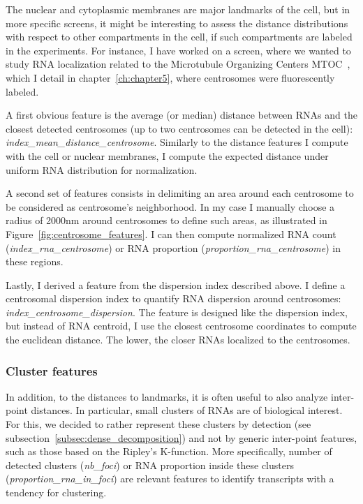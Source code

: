 The nuclear and cytoplasmic membranes are major landmarks of the cell, but in more specific screens, it might be interesting to assess the distance distributions with respect to other compartments in the cell, if such compartments are labeled in the experiments.
For instance, I have worked on a screen, where we wanted to study \ac{RNA} localization related to the Microtubule Organizing Centers \ac{MTOC}~\cite{safieddine_choreography_2021}, which I detail in chapter~\ref{ch:chapter5}, where centrosomes were fluorescently labeled.

A first obvious feature is the average (or median) distance between \ac{RNA}s and the closest detected centrosomes (up to two centrosomes can be detected in the cell): \emph{index\_mean\_distance\_centrosome}.
Similarly to the distance features I compute with the cell or nuclear membranes, I compute the expected distance under uniform \ac{RNA} distribution for normalization.

A second set of features consists in delimiting an area around each centrosome to be considered as centrosome's neighborhood.
In my case I manually choose a radius of 2000nm around centrosomes to define such areas, as illustrated in Figure~\ref{fig:centrosome_features}.
I can then compute normalized \ac{RNA} count (\emph{index\_rna\_centrosome}) or \ac{RNA} proportion (\emph{proportion\_rna\_centrosome}) in these regions.

Lastly, I derived a feature from the dispersion index described above.
I define a centrosomal dispersion index to quantify \ac{RNA} dispersion around centrosomes: \emph{index\_centrosome\_dispersion}.
The feature is designed like the dispersion index, but instead of \ac{RNA} centroid, I use the closest centrosome coordinates to compute the euclidean distance.
The lower, the closer \ac{RNA}s localized to the centrosomes.

\subsubsection{Cluster features}

In addition, to the distances to landmarks, it is often useful to also analyze inter-point distances.
In particular, small clusters of \ac{RNA}s are of biological interest.
For this, we decided to rather represent these clusters by detection (see subsection~\ref{subsec:dense_decomposition}) and not by generic inter-point features, such as those based on the Ripley's K-function.
More specifically, number of detected clusters (\emph{nb\_foci}) or \ac{RNA} proportion inside these clusters (\emph{proportion\_rna\_in\_foci}) are relevant features to identify transcripts with a tendency for clustering.\\


